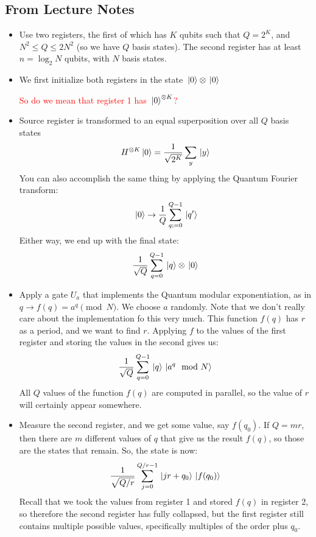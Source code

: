 \documentclass[10pt]{article}
\newcommand{\question}[1]{\textcolor{red}{#1}}
\renewcommand{\comment}[1]{\textcolor{blue!50}{#1}}
\begin{document}
	\subsection{From Lecture Notes} 
	\begin{itemize}
		\item Use two registers, the first of which has \( K \) qubits such that \( Q = 2^{K} \), and 
			\( N^2 \le Q \le 2N^2 \) (so we have \( Q \) basis states). 
			The second register has at least \( n = \log_2 N \) qubits, 
			with \( N \) basis states. 
		\item We first initialize both registers in the state \( \ket*{0} \otimes \ket*{0} \) 
			
			\question{So do we mean that register 1 has \( \ket*{0}^{\otimes K} \)?} 
		\item Source register is transformed to an equal superposition over all \( Q \) basis states
			\[
			H^{\otimes K}\ket*{0} = \frac{1}{\sqrt{2^{K}} }\sum_y \ket*{y}
			\] 
			You can also accomplish the same thing by applying the Quantum Fourier transform:
			\[
			\ket*{0} \to \frac{1}{Q}\sum_{q;=0}^{Q-1} \ket*{q'}
			\] 
			Either way, we end up with the final state:
			\[
			\frac{1}{\sqrt{Q} }\sum_{q=0}^{Q-1} \ket*{q}\otimes \ket*{0}
			\]
		\item Apply a gate \( U_a \) that implements the Quantum modular exponentiation, as in 
			\( q \to f(q) = a^{q} \pmod N \). We choose \( a \) randomly. Note that we don't really care about 
			the implementation fo this very much. This function  \( f(q) \) has \( r \) as a period, and 
			we want to find \( r \). Applying \( f \) to the values of the first register and 
			storing the values in the second gives us:
			\[
			\frac{1}{\sqrt{Q} }\sum_{q=0}^{Q-1} \ket*{q}\ket*{a^{q}\mod N}
			\] 
			All \( Q  \) values of the function \( f(q) \) are computed in parallel, so the value of \( 
			r\) will certainly appear somewhere.
		\item Measure the second register, and we get some value, say \( f(q_0) \). If \( Q = mr \), then 
			there are \( m \) different values of \( q \) that give us the result \( f(q) \), so those 
			are the states that remain. So, the state is now:
			\[
			\frac{1}{\sqrt{Q / r} }\sum_{j=0}^{Q / r - 1} \ket*{jr + q_0}\ket*{f(q_0)}
			\] 
			\comment{Recall that we took the values from register 1 and stored \( f(q) \) in register 2, so therefore 
				the second register has fully collapsed, but the first register still contains multiple 
			possible values, specifically multiples of the order plus \( q_0 \).}

\end{itemize}
\end{document}
